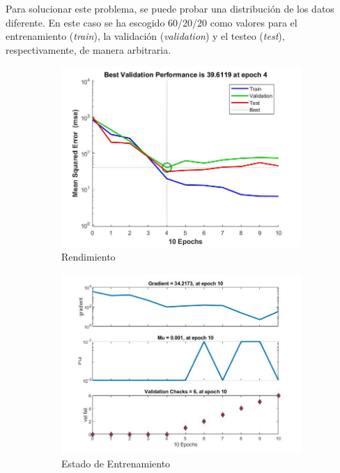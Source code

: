 \documentclass{article}
\begin{document}
Para solucionar este problema, se puede probar una distribución de los datos
diferente. En este caso se ha escogido 60/20/20 como valores para el
entrenamiento (\textit{train}), la validación (\textit{validation}) y el testeo
(\textit{test}), respectivamente, de manera arbitraria.

\begin{figure}[H]
 \centering
 \begin{subfigure}{0.4\textwidth}
  \includegraphics[width=0.8\linewidth]{../images/I_ex3_performance_bodyfat_dataset_div60-20-20.jpg}
  \caption{Rendimiento}
 \end{subfigure}
 \begin{subfigure}{0.4\textwidth}
  \includegraphics[width=0.8\linewidth]{../images/I_ex3_trainingstate_bodyfat_dataset_div60-20-20.jpg}
  \caption{Estado de Entrenamiento}
 \end{subfigure}
 \begin{subfigure}{0.4\textwidth}

\end{subfigure}
\end{figure}
\end{document}
